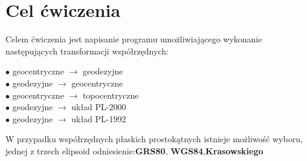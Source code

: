 \section{Cel ćwiczenia}
\begin{flushleft}
	\hspace{1cm}Celem ćwiczenia jest napisanie programu umożliwiającego wykonanie następujących transformacji współrzędnych:\\
\end{flushleft}
\begin{center}
		$\bullet$ geocentryczne $\rightarrow$ geodezyjne\\
	$\bullet$ geodezyjne $\rightarrow$ geocentryczne\\
	$\bullet$ geocentryczne $\rightarrow$ topocentryczne\\
	$\bullet$ geodezyjne $\rightarrow$ układ PL-2000\\
	$\bullet$ geodezyjne $\rightarrow$ układ PL-1992\\
\end{center}

\begin{flushleft}
	W przypadku współrzędnych płaskich prostokątnych istnieje możliwość wyboru, jednej z trzech elipsoid odniesienie:\textbf{GRS80}, \textbf{WGS84},\textbf{Krasowskiego}
\end{flushleft}


